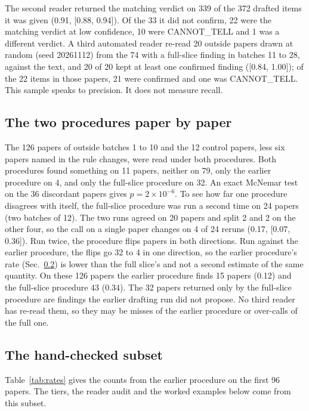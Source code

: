 \documentclass[reprint,amsmath,amssymb,aps,superscriptaddress,nofootinbib]{revtex4-2}
\begin{document}
The second reader returned the matching verdict on 339 of the 372 drafted items it was given (0.91, [0.88, 0.94]). Of the 33 it did not confirm, 22 were the matching verdict at low confidence, 10 were CANNOT\_TELL and 1 was a different verdict. A third automated reader re-read 20 outside papers drawn at random (seed 20261112) from the 74 with a full-slice finding in batches 11 to 28, against the text, and 20 of 20 kept at least one confirmed finding ([0.84, 1.00]); of the 22 items in those papers, 21 were confirmed and one was CANNOT\_TELL. This sample speaks to precision. It does not measure recall.

\subsection{The two procedures paper by paper}

The 126 papers of outside batches 1 to 10 and the 12 control papers, less six papers named in the rule changes, were read under both procedures. Both procedures found something on 11 papers, neither on 79, only the earlier procedure on 4, and only the full-slice procedure on 32. An exact McNemar test on the 36 discordant papers gives $p = 2\times10^{-6}$. To see how far one procedure disagrees with itself, the full-slice procedure was run a second time on 24 papers (two batches of 12). The two runs agreed on 20 papers and split 2 and 2 on the other four, so the call on a single paper changes on 4 of 24 reruns (0.17, [0.07, 0.36]). Run twice, the procedure flips papers in both directions. Run against the earlier procedure, the flips go 32 to 4 in one direction, so the earlier procedure's rate (Sec.~\ref{sec:rates}) is lower than the full slice's and not a second estimate of the same quantity. On these 126 papers the earlier procedure finds 15 papers (0.12) and the full-slice procedure 43 (0.34). The 32 papers returned only by the full-slice procedure are findings the earlier drafting run did not propose. No third reader has re-read them, so they may be misses of the earlier procedure or over-calls of the full one.

\subsection{The hand-checked subset}
\label{sec:rates}

Table~\ref{tab:rates} gives the counts from the earlier procedure on the first 96 papers. The tiers, the reader audit and the worked examples below come from this subset.
\end{document}
